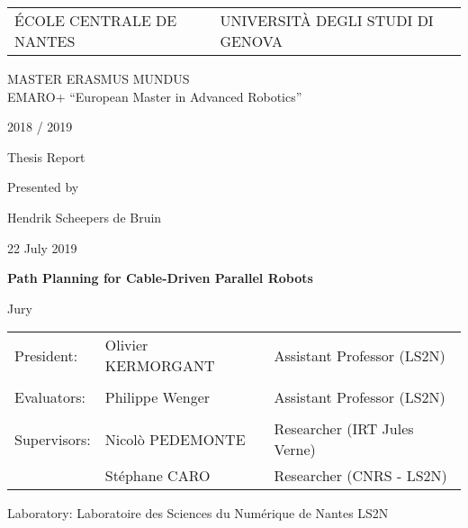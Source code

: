 \def\lskip{\vspace{0.5cm}}


\begin{tabular}{p{7cm}p{8cm}}
	ÉCOLE CENTRALE DE NANTES & UNIVERSITÀ DEGLI STUDI DI GENOVA
\end{tabular}

\vspace{2cm}

\begin{center}
	\large\sc MASTER ERASMUS MUNDUS \\ 
	\normalsize{EMARO+ ``European Master in Advanced Robotics''}
\end{center}

\begin{center}
	2018 / 2019
	\lskip%

	Thesis Report
	\lskip%

	Presented by
	\lskip%

	Hendrik Scheepers de Bruin
	\lskip%

	22 July 2019
	\lskip\lskip%

	{\Large \textbf{Path Planning for Cable-Driven Parallel Robots}}

\end{center}

\vfill

\begin{center}
	Jury
\end{center}

\begin{tabular}{p{} p{} p{}}
	President:		& Olivier KERMORGANT	& Assistant Professor (LS2N) \\
	\\
	Evaluators:		& Philippe Wenger 		& Assistant Professor (LS2N) \\
	\\
	Supervisors:	& Nicolò PEDEMONTE		& Researcher (IRT Jules Verne) \\
					& Stéphane CARO			& Researcher (CNRS - LS2N) \\
\end{tabular}

\lskip%

Laboratory: Laboratoire des Sciences du Numérique de Nantes LS2N
